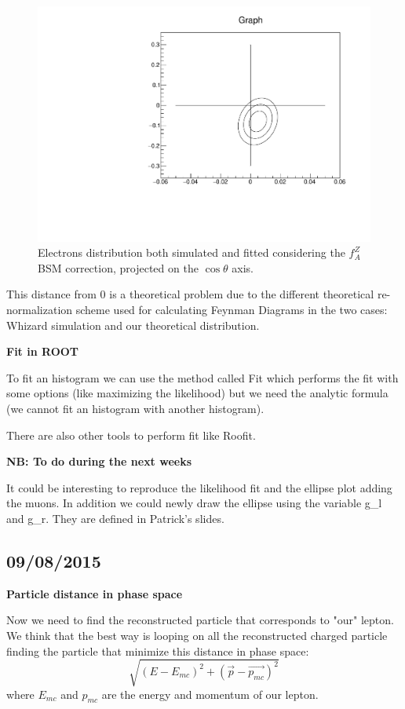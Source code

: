 \begin{figure} [htp]
\centering
\includegraphics[scale=0.7]{03_ellipse_3_cl.pdf}
\caption{Electrons distribution both simulated and fitted considering the $f_A^Z$ BSM correction, projected on the $\cos\theta$ axis.}
\label{03_ellipse_3_cl}
\end{figure}

This distance from 0 is a theoretical problem due to the different theoretical re-normalization scheme used for calculating Feynman Diagrams in the two cases: Whizard simulation and our theoretical distribution.

\textbf{Fit in ROOT}

To fit an histogram we can use the method called Fit which performs the fit with some options (like maximizing the likelihood) but we need the analytic formula (we cannot fit an histogram with another histogram).

There are also other tools to perform fit like Roofit.

\textbf{NB: To do during the next weeks}

It could be interesting to reproduce the likelihood fit and the ellipse plot adding the muons. In addition we could newly draw the ellipse using the variable g\_l and g\_r. They are defined in Patrick's slides.

\subsection{09/08/2015}

\textbf{Particle distance in phase space}

Now we need to find the reconstructed particle that corresponds to "our" lepton. We think that the best way is looping on all the reconstructed charged particle finding the particle that minimize this distance in phase space:
\[ \sqrt{(E-E_{mc})^2 + (\vec{p}-\vec{p_{mc}})^2}\]
where $E_{mc}$ and $p_{mc}$ are the energy and momentum of our lepton.

